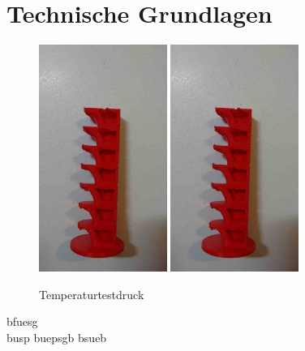 \chapter{Technische Grundlagen}

\begin{figure}[h!]

	\includegraphics[height=20em]{images/techGr/Temperaturtest}
	\hspace*{1em}
	\includegraphics[height=20em]{images/techGr/Temperaturtest}
	\caption[Temperaturtest]{Temperaturtestdruck}
	\label{grafik:techGr:Temperaturtest}
\end{figure}


bfuesg \\
busp
buepsgb 
\vspace*{1em}
bsueb\\
